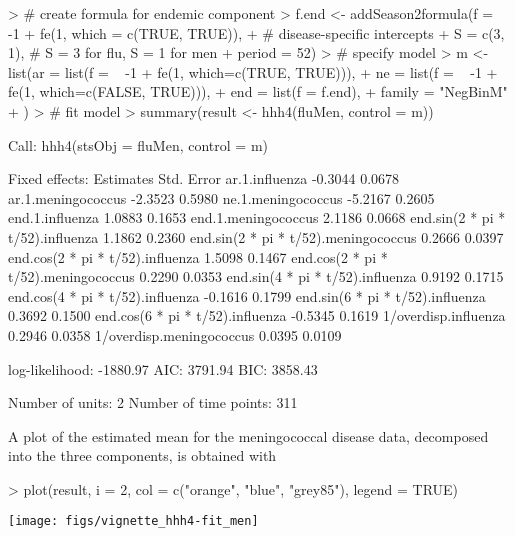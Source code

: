 \documentclass[a4paper,11pt]{article}
\begin{document}
\begin{Schunk}
\begin{Sinput}
> # create formula for endemic component
> f.end <- addSeason2formula(f = ~ -1 + fe(1, which = c(TRUE, TRUE)), 
+                                            # disease-specific intercepts
+                            S = c(3, 1),    # S = 3 for flu, S = 1 for men
+                            period = 52)
> # specify model
> m <- list(ar = list(f = ~ -1 + fe(1, which=c(TRUE, TRUE))), 
+           ne = list(f = ~ -1 + fe(1, which=c(FALSE, TRUE))), 
+           end = list(f = f.end),
+           family = "NegBinM"
+           )
> # fit model
> summary(result <- hhh4(fluMen, control = m))
\end{Sinput}
\begin{Soutput}
Call: 
hhh4(stsObj = fluMen, control = m)


Fixed effects: 
                                      Estimates  Std. Error
ar.1.influenza                          -0.3044      0.0678
ar.1.meningococcus                      -2.3523      0.5980
ne.1.meningococcus                      -5.2167      0.2605
end.1.influenza                          1.0883      0.1653
end.1.meningococcus                      2.1186      0.0668
end.sin(2 * pi * t/52).influenza         1.1862      0.2360
end.sin(2 * pi * t/52).meningococcus     0.2666      0.0397
end.cos(2 * pi * t/52).influenza         1.5098      0.1467
end.cos(2 * pi * t/52).meningococcus     0.2290      0.0353
end.sin(4 * pi * t/52).influenza         0.9192      0.1715
end.cos(4 * pi * t/52).influenza        -0.1616      0.1799
end.sin(6 * pi * t/52).influenza         0.3692      0.1500
end.cos(6 * pi * t/52).influenza        -0.5345      0.1619
1/overdisp.influenza                     0.2946      0.0358
1/overdisp.meningococcus                 0.0395      0.0109

log-likelihood:    -1880.97 
AIC:               3791.94 
BIC:               3858.43 

Number of units:          2 
Number of time points:    311 
\end{Soutput}
\end{Schunk}
A plot of the estimated mean for the meningococcal disease data, 
decomposed into the three components, is obtained with
\begin{center}
\begin{Schunk}
\begin{Sinput}
> plot(result, i = 2, col = c("orange", "blue", "grey85"), legend = TRUE)
\end{Sinput}
\end{Schunk}
\texttt{[image: figs/vignette\_hhh4-fit\_men]}
\end{center}
\end{document}
